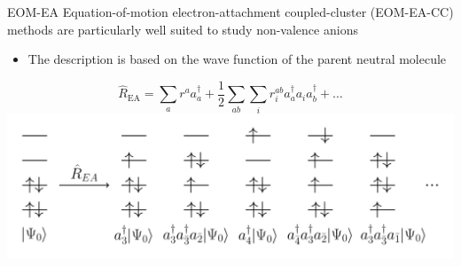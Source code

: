 \documentclass[9pt,t,xcolor=table]{beamer}
\begin{document}
\begin{frame}{\huge EOM-EA}\large
	Equation-of-motion electron-attachment coupled-cluster (EOM-EA-CC) methods are particularly well suited to study non-valence anions
	\vspace{5pt}
	\begin{itemize}
		\item The description is based on the wave function of the parent neutral molecule
	\end{itemize}
	\centering
	\vspace{5pt} 
			\[ \hat{R}_{\mathrm{EA}} = \sum_{a} r^a a_a^\dagger + \frac{1}{2} \sum_{ab} \sum_{i} r_{i}^{ab} a_a^\dagger a_i a_b^\dagger + \dots \]
	\includegraphics[width=\textwidth]{Figs/EOM_EA.pdf}
\end{frame}
\end{document}
